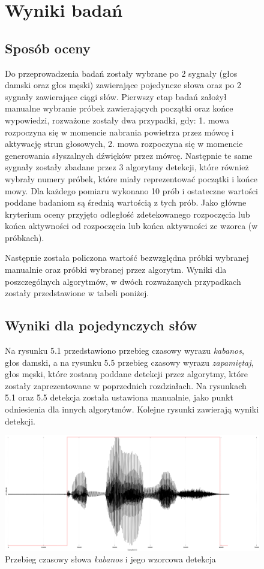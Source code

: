 \documentclass[eng,printmode]{mgr}
\begin{document}
\begin{figure}
	\chapter{Wyniki badań}
	 \section{Sposób oceny}
			Do przeprowadzenia badań zostały wybrane po 2 sygnały (głos damski oraz głos męski) zawierające pojedyncze słowa oraz po 2 sygnały zawierające ciągi słów. Pierwszy etap badań założył manualne wybranie próbek zawierających początki oraz końce wypowiedzi, rozważone zostały dwa przypadki, gdy: 
			1.  mowa rozpoczyna się w momencie nabrania powietrza przez mówcę i aktywację strun głosowych,
			2. 	mowa rozpoczyna się w momencie generowania słyszalnych dźwięków przez mówcę.
			Następnie te same sygnały zostały zbadane przez 3 algorytmy detekcji, które również wybrały numery próbek, które miały reprezentować początki i końce mowy. Dla każdego pomiaru wykonano 10 prób i ostateczne wartości poddane badaniom są średnią wartością z tych prób. Jako główne kryterium oceny przyjęto odległość zdetekowanego rozpoczęcia lub końca aktywności od rozpoczęcia lub końca aktywności ze wzorca (w próbkach). 
			
		 Następnie została policzona wartość bezwzględna próbki wybranej manualnie oraz próbki wybranej przez algorytm. Wyniki dla poszczególnych algorytmów, w dwóch rozważanych przypadkach zostały przedstawione w tabeli poniżej.
	 \section{Wyniki dla pojedynczych słów}
	 Na rysunku 5.1 przedstawiono przebieg czasowy wyrazu \emph{kabanos}, głos damski, a na rysunku 5.5 przebieg czasowy wyrazu \emph{zapamiętaj}, głos męski, które zostaną poddane detekcji przez algorytmy, które zostały zaprezentowane w poprzednich rozdziałach. Na rysunkach 5.1 oraz 5.5 detekcja została ustawiona manualnie, jako punkt odniesienia dla innych algorytmów.
	 Kolejne rysunki zawierają wyniki detekcji.
		 \begin{center}
			 	\includegraphics[scale=0.2]{kabanos.png}
			 	\caption{Przebieg czasowy słowa \emph{kabanos} i jego wzorcowa detekcja}\vspace{5mm}
		 \end{center}
	\end{figure}
	
\end{document}
